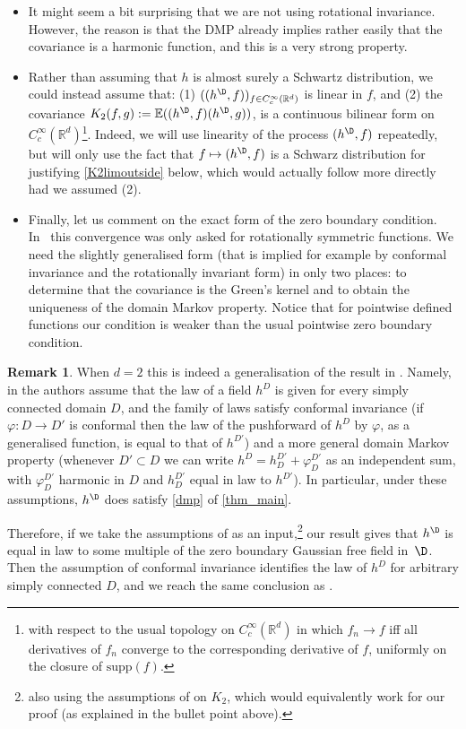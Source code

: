 \documentclass[JEP,XML,SOM,Unicode,published]{cedram}
\theoremstyle{definition}
\newtheorem{rmk}[theorem]{Remark}
\newcommand{\R}{\mathbb{R}}
\newcommand{\E}{\mathbb{E}}
\begin{document}
\begin{itemize}
\item It might seem a bit surprising that we are not using rotational invariance. However, the reason is that the DMP already implies rather easily that the covariance is a harmonic function, and this is a very strong property.
\item Rather than assuming that $h$ is almost surely a Schwartz distribution, we could instead assume that: (1) $((h^\D,f))_{f \in C_c^\infty(\R^d)}$ is linear in $f$, and (2) the covariance $K_2(f,g):=\E((h^\D,f)(h^\D,g))$, is a continuous bilinear form on $C_c^\infty(\R^d)$\footnote{with respect to the usual topology on $C_c^\infty(\R^d)$ in which $f_n\to f$ iff all derivatives of $f_n$ converge to the corresponding derivative of $f$, uniformly on the closure of ${\mathrm{supp}(f)}$.}. Indeed, we will use linearity of the process $(h^{\D},f)$ repeatedly, but will only use the fact that $f\mapsto (h^{\D},f)$ is a Schwarz distribution for justifying \eqref{K2limoutside} below, which would actually follow more directly had we assumed (2).
\item Finally, let us comment on the exact form of the zero boundary condition. In~\cite{BPR18} this convergence was only asked for rotationally symmetric functions. We need the slightly generalised form (that is implied for example by conformal invariance and the rotationally invariant form) in only two places: to determine that the covariance is the Green's kernel and to obtain the uniqueness of the domain Markov property. Notice that for pointwise defined functions our condition is weaker than the usual pointwise zero boundary condition.
\end{itemize}

\begin{rmk}
When $d=2$ this is indeed a generalisation of the result in \cite{BPR18}. Namely, in \cite{BPR18} the authors assume that the law of a field $h^D$ is given for \hbox{every} simply connected domain $D$, and the family of laws satisfy conformal invariance (if~$\varphi:D\to D'$ is conformal then the law of the pushforward of $h^D$ by $\varphi$, as a generalised function, is equal to that of $h^{D'}$) and a more general domain Markov property (whenever $D'\subset D$ we can write $h^D=h_D^{D'}+\varphi_D^{D'}$ as an independent sum, with $\varphi_D^{D'}$ harmonic in $D$ and $h_D^{D'}$ equal in law to $h^{D'}$). In particular, under these assumptions, $h^{\D}$ does satisfy \eqref{dmp} of \cref{thm_main}.

Therefore, if we take the assumptions of \cite{BPR18} as an input,\footnote{also using the assumptions of \cite{BPR18} on $K_2$, which would equivalently work for our proof (as explained in the bullet point above).} our result gives that $h^{\D}$ is equal in law to some multiple of the zero boundary Gaussian free field in~$\D$. Then the assumption of conformal invariance identifies the law of $h^D$ for arbitrary simply connected $D$, and we reach the same conclusion as \cite{BPR18}.
\end{rmk}
\end{document}
